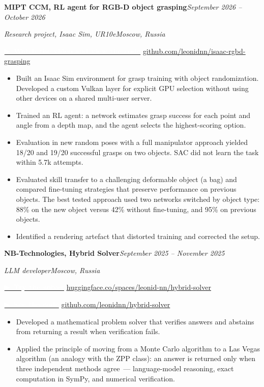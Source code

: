 \documentclass[10pt,a4paper]{article}
\newcommand{\entry}[4]{%
  \par\noindent\textbf{#1}\hfill\textit{#2}\par
  \noindent\textit{#3}\hfill\textit{#4}\par\vspace{2pt}}
\newcommand{\entrygap}{\par\vspace{0.5cm}}
\newcommand{\projlink}[3]{%
  \par\noindent\href{#1}{\colorbox{linkbtn}{\textcolor{white}{\small\textbf{▶~#2}}}}%
  \hspace{6pt}\href{#1}{\small\underline{#3}}\par\vspace{3pt}}
\begin{document}
\entry{MIPT CCM, RL agent for RGB-D object grasping}{September 2026 -- October 2026}{Research project, Isaac Sim, UR10e}{Moscow, Russia}
\projlink{https://github.com/leonidnn/isaac-rgbd-grasping}{Watch the video and view the code}{github.com/leonidnn/isaac-rgbd-grasping}
\begin{itemize}[leftmargin=*,nosep]
\item Built an Isaac Sim environment for grasp training with object randomization. Developed a custom Vulkan layer for explicit GPU selection without using other devices on a shared multi-user server.
\item Trained an RL agent: a network estimates grasp success for each point and angle from a depth map, and the agent selects the highest-scoring option.
\item Evaluation in new random poses with a full manipulator approach yielded 18/20 and 19/20 successful grasps on two objects. SAC did not learn the task within 5.7k attempts.
\item Evaluated skill transfer to a challenging deformable object (a bag) and compared fine-tuning strategies that preserve performance on previous objects. The best tested approach used two networks switched by object type: 88\% on the new object versus 42\% without fine-tuning, and 95\% on previous objects.
\item Identified a rendering artefact that distorted training and corrected the setup.
\end{itemize}
\entrygap

\entry{NB-Technologies, Hybrid Solver}{September 2025 -- November 2025}{LLM developer}{Moscow, Russia}
\projlink{https://huggingface.co/spaces/leonid-nn/hybrid-solver}{Try the solver}{huggingface.co/spaces/leonid-nn/hybrid-solver}
\projlink{https://github.com/leonidnn/hybrid-solver}{See the code}{github.com/leonidnn/hybrid-solver}
\begin{itemize}[leftmargin=*,nosep]
\item Developed a mathematical problem solver that verifies answers and abstains from returning a result when verification fails.
\item Applied the principle of moving from a Monte Carlo algorithm to a Las Vegas algorithm (an analogy with the ZPP class): an answer is returned only when three independent methods agree~--- language-model reasoning, exact computation in SymPy, and numerical verification.
\end{itemize}
\entrygap
\end{document}
